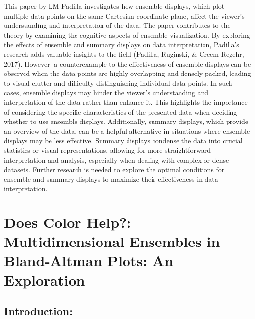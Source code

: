 \documentclass[print]{nuthesis}
\begin{document}
This paper by LM Padilla investigates how ensemble displays, which plot multiple data points on the same Cartesian coordinate plane, affect the viewer's understanding and interpretation of the data.
The paper contributes to the theory by examining the cognitive aspects of ensemble visualization.
By exploring the effects of ensemble and summary displays on data interpretation, Padilla's research adds valuable insights to the field (Padilla, Ruginski, \& Creem-Regehr, 2017).
However, a counterexample to the effectiveness of ensemble displays can be observed when the data points are highly overlapping and densely packed, leading to visual clutter and difficulty distinguishing individual data points.
In such cases, ensemble displays may hinder the viewer's understanding and interpretation of the data rather than enhance it.
This highlights the importance of considering the specific characteristics of the presented data when deciding whether to use ensemble displays.
Additionally, summary displays, which provide an overview of the data, can be a helpful alternative in situations where ensemble displays may be less effective.
Summary displays condense the data into crucial statistics or visual representations, allowing for more straightforward interpretation and analysis, especially when dealing with complex or dense datasets.
Further research is needed to explore the optimal conditions for ensemble and summary displays to maximize their effectiveness in data interpretation.

\hypertarget{ref-labels}{%
\chapter{Does Color Help?: Multidimensional Ensembles in Bland-Altman Plots: An Exploration}\label{ref-labels}}

\hypertarget{introduction-3}{%
\section{Introduction:}\label{introduction-3}}
\end{document}
